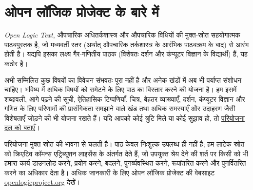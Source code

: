 \chapter*{ओपन लॉजिक प्रोजेक्ट के बारे में}


\textit{Open Logic Text}, औपचारिक अधितर्कशास्त्र और औपचारिक विधियों की
मुक्त-स्रोत सहयोगात्मक पाठ्यपुस्तक है, जो मध्यवर्ती स्तर (अर्थात् औपचारिक
तर्कशास्त्र के आरंभिक पाठ्यक्रम के बाद) से आरंभ होती है। यद्यपि इसका लक्ष्य
गैर-गणितीय पाठक (विशेषतः दर्शन और कंप्यूटर विज्ञान के विद्यार्थी) हैं, यह
कठोर है।

अभी सम्मिलित कुछ विषयों का विवेचन संभवतः पूरा नहीं है और अनेक खंडों में अब
भी पर्याप्त संशोधन चाहिए। भविष्य में अधिक विषयों को समेटने के लिए पाठ का
विस्तार करने की योजना है। हम इसमें शब्दावली, आगे पढ़ने की सूची, ऐतिहासिक
टिप्पणियाँ, चित्र, बेहतर व्याख्याएँ, दर्शन, कंप्यूटर विज्ञान और गणित के लिए
परिणामों की प्रासंगिकता समझाने वाले खंड तथा अधिक समस्याएँ और उदाहरण जैसी
विशेषताएँ जोड़ने की भी योजना रखते हैं। यदि आपको कोई त्रुटि मिले या कोई सुझाव
हो, तो \href{https://github.com/OpenLogicProject/OpenLogic/wiki/Contributing}{परियोजना
दल को बताएँ}।

परियोजना मुक्त स्रोत की भावना से चलती है। पाठ केवल निःशुल्क उपलब्ध ही नहीं
है; हम लाटेक स्रोत को क्रिएटिव कॉमन्स एट्रिब्यूशन लाइसेंस के अंतर्गत देते
हैं, जो उपयुक्त श्रेय देने की शर्त पर किसी को भी हमारा कार्य डाउनलोड करने,
प्रयोग करने, बदलने, पुनर्व्यवस्थित करने, रूपांतरित करने और पुनर्वितरित करने का
अधिकार देता है। अधिक जानकारी के लिए ओपन लॉजिक प्रोजेक्ट की वेबसाइट
\href{http://openlogicproject.org/}{openlogicproject.org} देखें।
